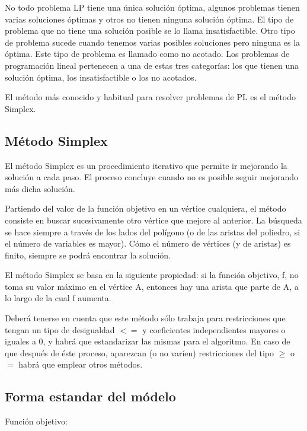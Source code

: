 No todo problema LP tiene una \'unica soluci\'on \'optima, algunos problemas tienen varias soluciones \'optimas y otros no tienen ninguna soluci\'on \'optima. El tipo de problema que no tiene una soluci\'on posible se lo llama insatisfactible. Otro tipo de problema sucede cuando tenemos varias posibles soluciones pero ninguna es la \'optima. Este tipo de problema es llamado como no acotado. Los problemas de programaci\'on lineal pertenecen  a una de estas tres categor\'ias: los que tienen una soluci\'on \'optima, los insatisfactible o los no acotados.

El m\'etodo m\'as conocido y habitual para resolver problemas de PL es el m\'etodo Simplex. 

\subsection{M\'etodo Simplex}


El m\'etodo Simplex es un procedimiento iterativo que permite ir mejorando la soluci\'on a cada paso. El proceso concluye cuando no es posible seguir mejorando m\'as dicha soluci\'on.

Partiendo del valor de la funci\'on objetivo en un v\'ertice cualquiera, el m\'etodo consiste en buscar sucesivamente otro v\'ertice que mejore al anterior. La b\'usqueda se hace siempre a trav\'es de los lados del pol\'igono (o de las aristas del poliedro, si el n\'umero de variables es mayor). C\'omo el n\'umero de v\'ertices (y de aristas) es finito, siempre se podr\'a encontrar la soluci\'on.


El m\'etodo Simplex se basa en la siguiente propiedad: si la funci\'on objetivo, f, no toma su valor m\'aximo en el v\'ertice A, entonces hay una arista que parte de A, a lo largo de la cual f aumenta.


Deber\'a tenerse en cuenta que este m\'etodo s\'olo trabaja para restricciones que tengan un tipo de desigualdad $<=$ y coeficientes independientes mayores o iguales a 0, y habr\'a que estandarizar las mismas para el algoritmo. En caso de que despu\'es de \'este proceso, aparezcan (o no var\'ien) restricciones del tipo $\geq$ o $=$ habr\'a que emplear otros m\'etodos.


\newpage
\subsection{Forma estandar del m\'odelo}


				
				Funci\'on objetivo: 
									
